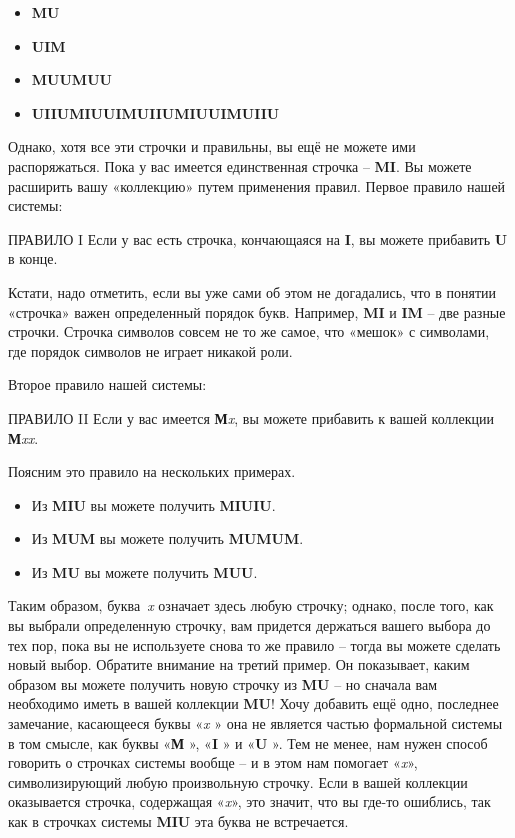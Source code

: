 \documentclass[../main.tex]{subfiles}
\begin{document}
\begin{itemize}[label={}, noitemsep, topsep=2pt, leftmargin=\parindent]
    \item \textbf{MU}
    \item \textbf{UIM}
    \item \textbf{MUUMUU}
    \item \textbf{UIIUMIUUIMUIIUMIUUIMUIIU}
\end{itemize}

Однако, хотя все эти строчки и правильны, вы ещё не можете ими распоряжаться.
Пока у вас имеется единственная строчка \--- \textbf{MI}.
Вы можете расширить вашу «коллекцию» путем применения правил.
Первое правило нашей системы:

\begin{mybox}{ПРАВИЛО I}
    Если у вас есть строчка, кончающаяся на \textbf{I}, вы можете прибавить \textbf{U} в конце.
\end{mybox}

Кстати, надо отметить, если вы уже сами об этом не догадались, что в понятии «строчка» важен определенный порядок букв. Например, \textbf{MI} и \textbf{IM} \--- две разные строчки. Строчка символов совсем не то же самое, что «мешок» с символами, где порядок символов не играет никакой роли.

Второе правило нашей системы:

\begin{mybox}{ПРАВИЛО II}
    Если у вас имеется \textbf{М}\textit{x}, вы можете прибавить к вашей коллекции \textbf{М}\textit{xx}.
\end{mybox}

Поясним это правило на нескольких примерах.

\begin{itemize}[label={}, noitemsep, topsep=6pt, leftmargin=\parindent]
    \item Из \textbf{MIU} вы можете получить \textbf{MIUIU}.
    \item Из \textbf{MUM} вы можете получить \textbf{MUMUM}.
    \item Из \textbf{MU} вы можете получить \textbf{MUU}.
\end{itemize}

Таким образом, буква~\textit{x} означает здесь любую строчку; однако, после того, как вы выбрали определенную строчку, вам придется держаться вашего выбора до тех пор, пока вы не используете снова то же правило \--- тогда вы можете сделать новый выбор.
Обратите внимание на третий пример. Он показывает, каким образом вы можете получить новую строчку из \textbf{MU} \--- но сначала вам необходимо иметь в вашей коллекции \textbf{MU}!
Хочу добавить ещё одно, последнее замечание, касающееся буквы «\textit{x} » она не является частью формальной системы в том смысле, как буквы «\textbf{М} », «\textbf{I} » и «\textbf{U} ». Тем не менее, нам нужен способ говорить о строчках системы вообще \--- и в этом нам помогает «\textit{x}», символизирующий любую произвольную строчку. Если в вашей коллекции оказывается строчка, содержащая «\textit{x}», это значит, что вы где-то ошиблись, так как в строчках системы \textbf{MIU} эта буква не встречается.
\end{document}
